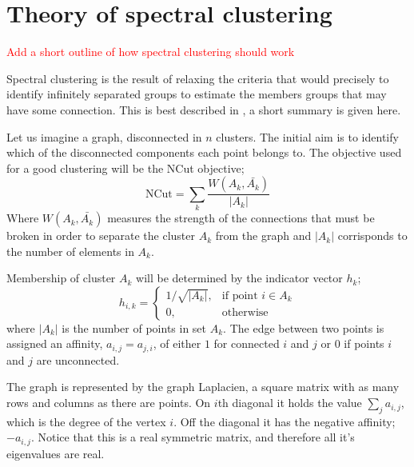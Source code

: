 \section{Theory of spectral clustering}\label{sec:spectral_theory}

\textcolor{red}{Add a short outline of how spectral clustering should work}

Spectral clustering is the result of relaxing the criteria that would precisely
to identify infinitely separated groups to estimate the members  groups that may have some connection.
This is best described in \cite{luxburg2007spectraltutorial}, a short summary is given here.

Let us imagine a graph, disconnected in \(n\) clusters.
The initial aim is to identify which of the disconnected components each point belongs to.
The objective used for a good clustering will be the NCut objective;
\begin{equation}
    \text{NCut} = \sum_k\frac{W(A_k, \bar{A_k})}{|A_k|}
\end{equation}
Where \(W(A_k, \bar{A_k})\) measures the strength of the connections that must be
broken in order to separate the cluster \(A_k\) from the graph
and \(|A_k|\) corrisponds to the number of elements in \(A_k\).

Membership of cluster \(A_k\) will be determined by the indicator vector \(h_k\);
\begin{equation}
    h_{i, k}= 
    \begin{cases}
        1/\sqrt{|A_k|},& \text{if point } i \in A_k \\
        0,              & \text{otherwise}
    \end{cases}
\end{equation}
where \(|A_k|\) is the number of points in set \(A_k\).
The edge between two points is assigned an affinity, \(a_{i,j} = a_{j, i}\),
of either \(1\) for connected \(i\) and \(j\) or \(0\) 
if points \(i\) and \(j\) are unconnected.

The graph is represented by the graph Laplacien, a square
matrix with as many rows and columns as there are points.
On \(i\)th diagonal it holds the value \(\sum_j a_{i, j}\),
which is the degree of the vertex \(i\).
Off the diagonal it has the negative affinity; \(-a_{i, j}\).
Notice that this is a real symmetric matrix,
and therefore all it's eigenvalues are real.


